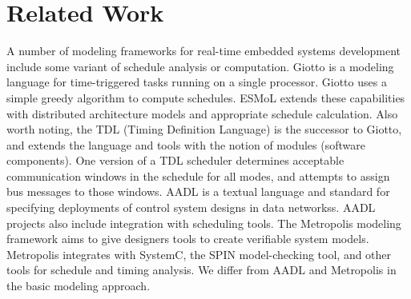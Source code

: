 \section{Related Work}
\label{relatedwork}

%
%
%
%
%

A number of modeling frameworks for real-time embedded systems development include some variant of schedule analysis or computation.  Giotto\cite{modeling:giotto3} is a modeling language for time-triggered tasks running on a single processor.  Giotto uses a simple greedy algorithm to compute schedules.  ESMoL extends these capabilities with distributed architecture models and appropriate schedule calculation.  Also worth noting, the TDL (Timing Definition Language) is the successor to Giotto, and extends the language and tools with the notion of modules (software components)\cite{timed:tdl}.  One version of a TDL scheduler determines acceptable communication windows in the schedule for all modes, and attempts to assign bus messages to those windows\cite{timed:tdlflexray}.  AADL is a textual language and standard for specifying deployments of control system designs in data networks\cite{modeling:aadl_control_systems}s.  AADL projects also include integration with scheduling tools\cite{sched:aadl_sched}. The Metropolis modeling framework\cite{modeling:metropolis} aims to give designers tools to create verifiable system models.  Metropolis integrates with SystemC, the SPIN model-checking tool, and other tools for schedule and timing analysis.  We differ from AADL and Metropolis in the basic modeling approach\cite{modeling:aces08}.



